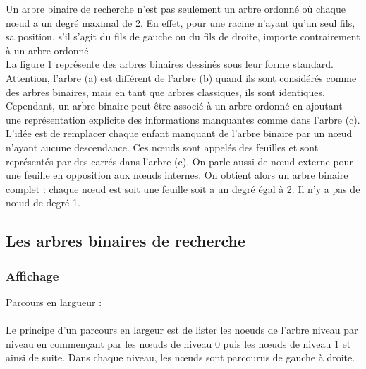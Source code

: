 \documentclass{report}
\begin{document}
\begin{center}
\label{fig1}
\end{center} 

Un arbre binaire de recherche n'est pas seulement un arbre ordonné où chaque nœud a un degré maximal de 2.  En effet, pour une racine n'ayant qu'un seul fils, sa position, s'il s'agit du fils de gauche ou du fils de droite, importe contrairement à un arbre ordonné.\\
La figure 1 représente des arbres binaires dessinés sous leur forme standard. Attention, l'arbre (a) est différent de l'arbre (b) quand ils sont considérés comme des arbres binaires, mais en tant que arbres classiques, ils sont identiques.\\
Cependant, un arbre binaire peut être associé à un arbre ordonné en ajoutant une représentation explicite des informations manquantes comme dans l'arbre (c). L'idée est de remplacer chaque enfant manquant de l'arbre binaire par un nœud n'ayant aucune descendance. Ces nœuds sont appelés des feuilles et sont représentés par des carrés dans l'arbre (c). On parle aussi de nœud externe pour une feuille en opposition aux nœuds internes. On obtient alors un arbre binaire complet : chaque nœud est soit une feuille soit a un degré égal à 2. Il n'y a pas de nœud de degré 1.\\


\subsection{Les arbres binaires de recherche}
\subsubsection{Affichage}

Parcours en largueur : \\
~\\
Le principe d'un parcours en largeur est de lister les noeuds de l'arbre niveau par niveau en commençant par les nœuds de niveau 0 puis les nœuds de niveau 1 et ainsi de suite. Dans chaque niveau, les nœuds sont parcourus de gauche à droite.\\ 

\end{document}
